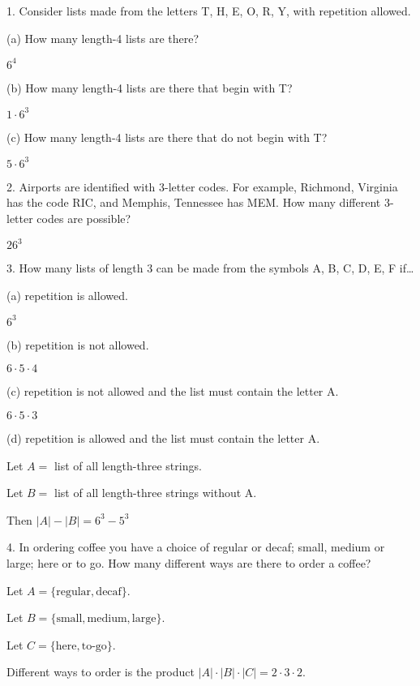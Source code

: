 \documentclass{hippoidC}
\begin{document}
\toc{}

\begin{prooflist} {1.  Consider lists made from the letters T, H, E, O, R, Y,
		with repetition allowed.}
	\item (a) How many length-4 lists are there?
	\item $ 6^4$
	\item (b) How many length-4 lists are there that begin with T?
	\item $ 1 \cdot 6^3$
	\item (c) How many length-4 lists are there that do not begin with T?
	\item $ 5 \cdot 6^3$
\end{prooflist}

\begin{prooflist} {2. Airports are identified with 3-letter codes. For example,
		Richmond, Virginia has the code RIC, and Memphis, Tennessee has MEM. How
		many different 3-letter codes are possible?}
	\item $ 26^3$
\end{prooflist}

\begin{prooflist} {3. How many lists of length 3 can be made from the symbols A,
		B, C, D, E, F if\ldots}
	\item (a) repetition is allowed.
	\item $ 6^3$
	\item (b) repetition is not allowed.
	\item $ 6\cdot 5 \cdot 4$
	\item (c) repetition is not allowed and the list must contain the letter A.
	\item $ 6\cdot 5 \cdot 3$
	\item (d) repetition is allowed and the list must contain the letter A.
	\item Let $A=$ list of all length-three strings.
	\item Let $B=$ list of all length-three strings without A.
	\item Then $|A| - |B| = 6^3 - 5^3$
\end{prooflist}

\begin{prooflist}{ 4. In ordering coffee you have a choice of regular or decaf;
		small, medium or large; here or to go. How many different ways are there to
		order a coffee? }
	\item Let $A = \{\text{regular}, \text{decaf}\}$.
	\item Let $B = \{\text{small}, \text{medium}, \text{large}\}$.
	\item Let $C = \{\text{here}, \text{to-go}\}$.
	\item Different ways to order is the product $|A|\cdot|B|\cdot|C| = 2 \cdot 3
		\cdot 2$.
\end{prooflist}
\end{document}
